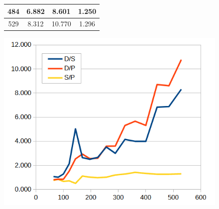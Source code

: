 \documentclass[letterpaper, 10 pt, conference]{ieeeconf}  %
\begin{document}
\begin{figure}
\begin{minipage}[b]{.45\linewidth}
\begin{center}
\begin{tabular}{|c|c|c|c|}
                                484               & 6.882          & 8.601           & 1.250            \\ \hline
                                529               & 8.312          & 10.770          & 1.296            \\ \hline
                                \end{tabular}
                \end{center}
                \label{fig:speedups}
        \end{minipage}\hfill
        \begin{minipage}[b]{.45\linewidth}
                \centering
                \includegraphics[width=1.0\linewidth]{speedups.png}
                 \label{fig:speedupsgraph}
        \end{minipage}
\end{figure}

\twocolumn
\end{document}
